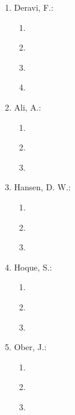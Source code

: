 \begin{enumerate}[label=\arabic*.,ref=\arabic*]
\begin{enumerate}[label*=\arabic*.,ref=\theenumi.\arabic*]
        \item \cite{harezlak2017eye} 
        \item \cite{kasprowski2016disk}				 
    \end{enumerate}
    \item Deravi, F.:  
    \begin{enumerate}[label*=\arabic*.,ref=\theenumi.\arabic*]
        \item \cite{deravi2011gaze} 
        \item \cite{ali2013spoofing} 
        \item \cite{ali2018gaze} 
        \item \cite{ali213spoofing}			 
    \end{enumerate}
    \item Ali, A.: 
    \begin{enumerate}[label*=\arabic*.,ref=\theenumi.\arabic*]
        \item \cite{ali2013spoofing} 
        \item \cite{ali2018gaze} 
        \item \cite{ali213spoofing}
    \end{enumerate}
    \item Hansen, D. W.:  
    \begin{enumerate}[label*=\arabic*.,ref=\theenumi.\arabic*]
        \item \cite{hansen2010eye} 
        \item \cite{vitonis2014person} 
        \item \cite{batista2015depth}	
    \end{enumerate}
    \item Hoque, S.:  
    \begin{enumerate}[label*=\arabic*.,ref=\theenumi.\arabic*]
        \item \cite{ali2013spoofing} 
        \item \cite{ali2018gaze} 
        \item \cite{ali213spoofing}	
    \end{enumerate}
    \item Ober, J.:              
    \begin{enumerate}[label*=\arabic*.,ref=\theenumi.\arabic*]
        \item \cite{kasprowski2004eye} 
        \item \cite{kasprowski2005enhancing} 
        \item \cite{kasprowski2004flick}			 
    \end{enumerate}

\end{enumerate}
